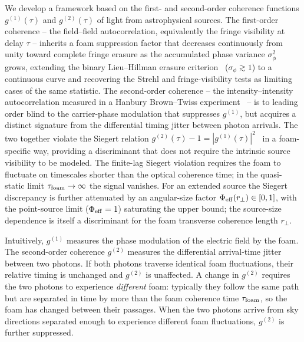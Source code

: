 \documentclass[aps,prd,onecolumn,amsmath,amssymb]{revtex4-2}
\begin{document}
We develop a framework based on the first- and second-order coherence
functions $g^{(1)}(\tau)$ and $g^{(2)}(\tau)$ of light from astrophysical
sources.
The first-order coherence -- the field--field autocorrelation, equivalently
the fringe visibility at delay $\tau$ -- inherits a foam suppression factor
that decreases continuously from unity toward complete fringe erasure as
the accumulated phase variance $\sigma_\phi^2$ grows, extending the binary
Lieu--Hillman erasure criterion~\cite{LieuHillman2003} ($\sigma_\phi\gtrsim 1$)
to a continuous curve and recovering the Strehl and fringe-visibility
tests as limiting cases of the same statistic.
The second-order coherence -- the intensity--intensity autocorrelation
measured in a Hanbury Brown--Twiss experiment~\cite{HBT1956} -- is to leading
order blind to the carrier-phase modulation that suppresses $g^{(1)}$, but
acquires a distinct signature from the differential timing jitter between
photon arrivals.
The two together violate the Siegert relation
$g^{(2)}(\tau) - 1 = |g^{(1)}(\tau)|^2$~\cite{Siegert1943} in a foam-specific
way, providing a discriminant that does not require the intrinsic source
visibility to be modeled.
The finite-lag Siegert violation requires the foam to fluctuate on timescales
shorter than the optical coherence time; in the quasi-static limit
$\tau_{\rm foam}\to\infty$ the signal vanishes.  For an extended source the
Siegert discrepancy is further attenuated by an angular-size factor
$\Phi_{\rm eff}(r_\perp)\in[0,1]$, with the point-source limit
($\Phi_{\rm eff}=1$) saturating the upper bound; the source-size
dependence is itself a discriminant for the foam transverse coherence
length $r_\perp$.

Intuitively, $g^{(1)}$ measures the phase modulation of the electric field by the
foam. The second-order coherence $g^{(2)}$ measures the
differential arrival-time jitter between two photons. If both photons traverse
identical foam fluctuations, their relative timing is unchanged and $g^{(2)}$ is
unaffected. A change in $g^{(2)}$ requires the two photons to experience
\emph{different} foam: typically they follow the same path but are separated
in time by more than the foam coherence time $\tau_{\rm foam}$, so the foam
has changed between their passages.
When the two photons arrive from sky directions separated enough to
experience different foam fluctuations, $g^{(2)}$ is further suppressed.
\end{document}
